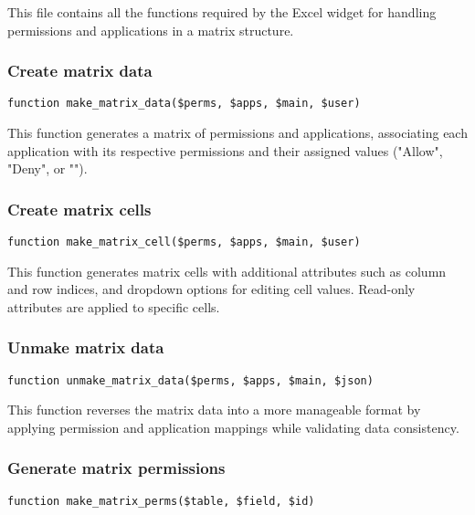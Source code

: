 \documentclass[a4paper]{article}
\begin{document}
This file contains all the functions required by the Excel widget for handling
permissions and applications in a matrix structure.

\hypertarget{toc169}{}
\subsubsection{Create matrix data}

\begin{lstlisting}
function make_matrix_data($perms, $apps, $main, $user)
\end{lstlisting}

This function generates a matrix of permissions and applications, associating each
application with its respective permissions and their assigned values ("Allow", "Deny", or "").

\hypertarget{toc170}{}
\subsubsection{Create matrix cells}

\begin{lstlisting}
function make_matrix_cell($perms, $apps, $main, $user)
\end{lstlisting}

This function generates matrix cells with additional attributes such as column and row indices,
and dropdown options for editing cell values. Read-only attributes are applied to specific cells.

\hypertarget{toc171}{}
\subsubsection{Unmake matrix data}

\begin{lstlisting}
function unmake_matrix_data($perms, $apps, $main, $json)
\end{lstlisting}

This function reverses the matrix data into a more manageable format by applying
permission and application mappings while validating data consistency.

\hypertarget{toc172}{}
\subsubsection{Generate matrix permissions}

\begin{lstlisting}
function make_matrix_perms($table, $field, $id)
\end{lstlisting}
\end{document}
